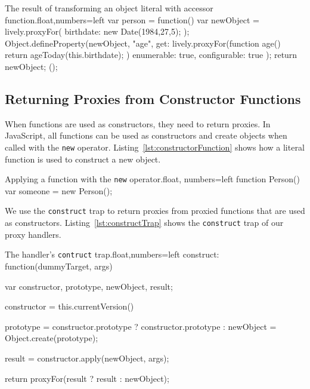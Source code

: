 \begin{code}{The result of transforming an object literal with accessor function.}{float,numbers=left}
var person = function() {
    var newObject = lively.proxyFor({
        birthdate: new Date(1984,27,5);
    });
    Object.defineProperty(newObject, "age", {
        get: lively.proxyFor(function age() {
            return ageToday(this.birthdate);
        })
        enumerable: true,
        configurable: true
    });
    return newObject;
}();
\end{code}
\iffalse
\end{verbatim}\fi



\subsection{Returning Proxies from Constructor Functions} 

When functions are used as constructors, they need to return proxies.
In JavaScript, all functions can be used as constructors and create objects when called with the \lstinline{new} operator.
Listing~\ref{lst:constructorFunction} shows how a literal function is used to construct a new object.

\begin{code}{Applying a function with the \lstinline{new} operator.}{float, numbers=left}
function Person() {}
var someone = new Person();
\end{code}
\iffalse
\end{verbatim}\fi

We use the \lstinline{construct} trap to return proxies from proxied functions that are used as constructors.
Listing~\ref{lst:constructTrap} shows the \lstinline{construct} trap of our proxy handlers.

\begin{code}{The handler's \lstinline{contruct} trap.}{float,numbers=left}
construct: function(dummyTarget, args) {
    var constructor, prototype, newObject, result;
    
    constructor = this.currentVersion()
    
    prototype = constructor.prototype ? constructor.prototype : {}    
    newObject = Object.create(prototype);
    
    result = constructor.apply(newObject, args);
    
    return proxyFor(result ? result : newObject);
}
\end{code}
\iffalse
\end{verbatim}\fi

